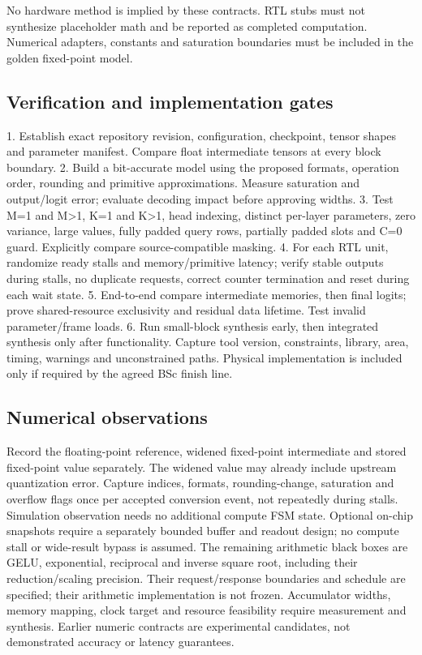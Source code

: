 \documentclass[11pt,a4paper]{article}
\begin{document}
No hardware method is implied by these contracts. RTL stubs must not synthesize placeholder math and be reported as completed computation. Numerical adapters, constants and saturation boundaries must be included in the golden fixed-point model.

\subsection{Verification and implementation gates}
1. Establish exact repository revision, configuration, checkpoint, tensor shapes and parameter manifest. Compare float intermediate tensors at every block boundary.
2. Build a bit-accurate model using the proposed formats, operation order, rounding and primitive approximations. Measure saturation and output/logit error; evaluate decoding impact before approving widths.
3. Test M=1 and M>1, K=1 and K>1, head indexing, distinct per-layer parameters, zero variance, large values, fully padded query rows, partially padded slots and C=0 guard. Explicitly compare source-compatible masking.
4. For each RTL unit, randomize ready stalls and memory/primitive latency; verify stable outputs during stalls, no duplicate requests, correct counter termination and reset during each wait state.
5. End-to-end compare intermediate memories, then final logits; prove shared-resource exclusivity and residual data lifetime. Test invalid parameter/frame loads.
6. Run small-block synthesis early, then integrated synthesis only after functionality. Capture tool version, constraints, library, area, timing, warnings and unconstrained paths. Physical implementation is included only if required by the agreed BSc finish line.

\subsection{Numerical observations}
Record the floating-point reference, widened fixed-point intermediate and stored fixed-point value separately. The widened value may already include upstream quantization error. Capture indices, formats, rounding-change, saturation and overflow flags once per accepted conversion event, not repeatedly during stalls. Simulation observation needs no additional compute FSM state. Optional on-chip snapshots require a separately bounded buffer and readout design; no compute stall or wide-result bypass is assumed.
The remaining arithmetic black boxes are GELU, exponential, reciprocal and inverse square root, including their reduction/scaling precision. Their request/response boundaries and schedule are specified; their arithmetic implementation is not frozen. Accumulator widths, memory mapping, clock target and resource feasibility require measurement and synthesis. Earlier numeric contracts are experimental candidates, not demonstrated accuracy or latency guarantees.
\end{document}
